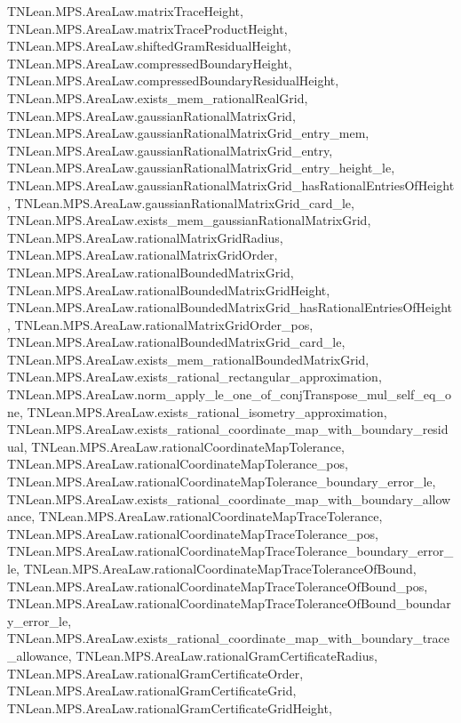 \begin{lemma}
{        TNLean.MPS.AreaLaw.matrixTraceHeight,
        TNLean.MPS.AreaLaw.matrixTraceProductHeight,
        TNLean.MPS.AreaLaw.shiftedGramResidualHeight,
        TNLean.MPS.AreaLaw.compressedBoundaryHeight,
        TNLean.MPS.AreaLaw.compressedBoundaryResidualHeight,
        TNLean.MPS.AreaLaw.exists_mem_rationalRealGrid,
        TNLean.MPS.AreaLaw.gaussianRationalMatrixGrid,
        TNLean.MPS.AreaLaw.gaussianRationalMatrixGrid_entry_mem,
        TNLean.MPS.AreaLaw.gaussianRationalMatrixGrid_entry,
        TNLean.MPS.AreaLaw.gaussianRationalMatrixGrid_entry_height_le,
        TNLean.MPS.AreaLaw.gaussianRationalMatrixGrid_hasRationalEntriesOfHeight,
        TNLean.MPS.AreaLaw.gaussianRationalMatrixGrid_card_le,
        TNLean.MPS.AreaLaw.exists_mem_gaussianRationalMatrixGrid,
        TNLean.MPS.AreaLaw.rationalMatrixGridRadius,
        TNLean.MPS.AreaLaw.rationalMatrixGridOrder,
        TNLean.MPS.AreaLaw.rationalBoundedMatrixGrid,
        TNLean.MPS.AreaLaw.rationalBoundedMatrixGridHeight,
        TNLean.MPS.AreaLaw.rationalBoundedMatrixGrid_hasRationalEntriesOfHeight,
        TNLean.MPS.AreaLaw.rationalMatrixGridOrder_pos,
        TNLean.MPS.AreaLaw.rationalBoundedMatrixGrid_card_le,
        TNLean.MPS.AreaLaw.exists_mem_rationalBoundedMatrixGrid,
        TNLean.MPS.AreaLaw.exists_rational_rectangular_approximation,
        TNLean.MPS.AreaLaw.norm_apply_le_one_of_conjTranspose_mul_self_eq_one,
        TNLean.MPS.AreaLaw.exists_rational_isometry_approximation,
        TNLean.MPS.AreaLaw.exists_rational_coordinate_map_with_boundary_residual,
        TNLean.MPS.AreaLaw.rationalCoordinateMapTolerance,
        TNLean.MPS.AreaLaw.rationalCoordinateMapTolerance_pos,
        TNLean.MPS.AreaLaw.rationalCoordinateMapTolerance_boundary_error_le,
        TNLean.MPS.AreaLaw.exists_rational_coordinate_map_with_boundary_allowance,
        TNLean.MPS.AreaLaw.rationalCoordinateMapTraceTolerance,
        TNLean.MPS.AreaLaw.rationalCoordinateMapTraceTolerance_pos,
        TNLean.MPS.AreaLaw.rationalCoordinateMapTraceTolerance_boundary_error_le,
        TNLean.MPS.AreaLaw.rationalCoordinateMapTraceToleranceOfBound,
        TNLean.MPS.AreaLaw.rationalCoordinateMapTraceToleranceOfBound_pos,
        TNLean.MPS.AreaLaw.rationalCoordinateMapTraceToleranceOfBound_boundary_error_le,
        TNLean.MPS.AreaLaw.exists_rational_coordinate_map_with_boundary_trace_allowance,
        TNLean.MPS.AreaLaw.rationalGramCertificateRadius,
        TNLean.MPS.AreaLaw.rationalGramCertificateOrder,
        TNLean.MPS.AreaLaw.rationalGramCertificateGrid,
        TNLean.MPS.AreaLaw.rationalGramCertificateGridHeight,
}
\end{lemma}
